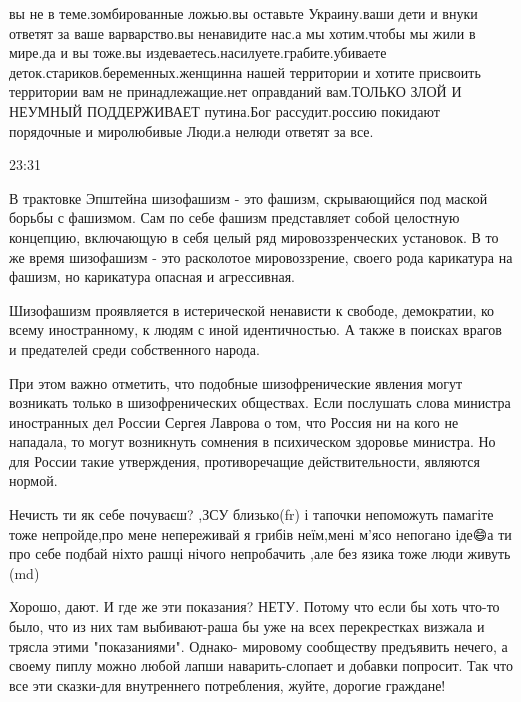 {%

вы не в теме.зомбированные ложью.вы оставьте Украину.ваши дети и внуки ответят
за ваше варварство.вы ненавидите нас.а мы хотим.чтобы мы жили в мире.да и вы
тоже.вы издеваетесь.насилуете.грабите.убиваете
деток.стариков.беременных.женщинна нашей территории и хотите присвоить
территории вам не принадлежащие.нет оправданий вам.ТОЛЬКО ЗЛОЙ И НЕУМНЫЙ
ПОДДЕРЖИВАЕТ путина.Бог рассудит.россию покидают порядочные и миролюбивые
Люди.а нелюди ответят за все.

23:31

В трактовке Эпштейна шизофашизм - это фашизм, скрывающийся под маской борьбы с
фашизмом. Сам по себе фашизм представляет собой целостную концепцию, включающую
в себя целый ряд мировоззренческих установок. В то же время шизофашизм - это
расколотое мировоззрение, своего рода карикатура на фашизм, но карикатура
опасная и агрессивная.

Шизофашизм проявляется в истерической ненависти к свободе, демократии, ко всему
иностранному, к людям с иной идентичностью. А также в поисках врагов и
предателей среди собственного народа.

При этом важно отметить, что подобные шизофренические явления могут возникать
только в шизофренических обществах. Если послушать слова министра иностранных
дел России Сергея Лаврова о том, что Россия ни на кого не нападала, то могут
возникнуть сомнения в психическом здоровье министра. Но для России такие
утверждения, противоречащие действительности, являются нормой.


Нечисть ти як себе почуваєш? ,ЗСУ близько(fr) і тапочки непоможуть памагіте
тоже непройде,про мене непереживай я грибів неїм,мені м'ясо непогано іде😄а ти
про себе подбай ніхто рашці нічого непробачить ,але без язика тоже люди живуть
(md)


Хорошо, дают. И где же эти показания? НЕТУ. Потому что если бы хоть что-то
было, что из них там выбивают-раша бы уже на всех перекрестках визжала и трясла
этими "показаниями". Однако- мировому сообществу предъявить нечего, а своему
пиплу можно любой лапши наварить-слопает и добавки попросит. Так что все эти
сказки-для внутреннего потребления, жуйте, дорогие граждане!



}
